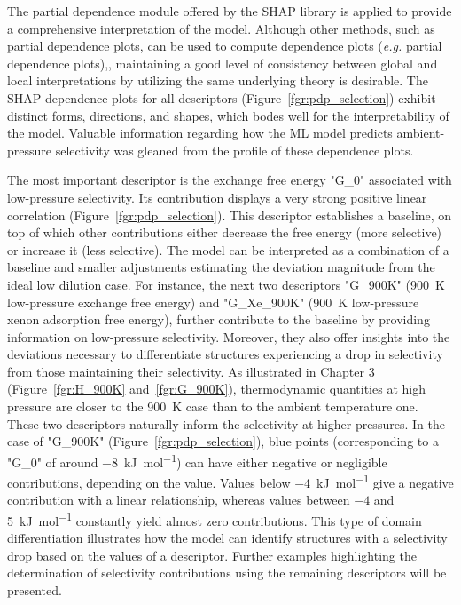 \documentclass[main]{subfiles}
\begin{document}
The partial dependence module offered by the SHAP library is applied to provide a comprehensive interpretation of the model. Although other methods, such as partial dependence plots, can be used to compute dependence plots (\emph{e.g.} partial dependence plots),\autocite{molnar2020interpretable}, maintaining a good level of consistency between global and local interpretations by utilizing the same underlying theory is desirable. The SHAP dependence plots for all descriptors (Figure~\ref{fgr:pdp_selection}) exhibit distinct forms, directions, and shapes, which bodes well for the interpretability of the model. Valuable information regarding how the ML model predicts ambient-pressure selectivity was gleaned from the profile of these dependence plots.

The most important descriptor is the exchange free energy "G\_0" associated with low-pressure selectivity. Its contribution displays a very strong positive linear correlation (Figure~\ref{fgr:pdp_selection}). This descriptor establishes a baseline, on top of which other contributions either decrease the free energy (more selective) or increase it (less selective). The model can be interpreted as a combination of a baseline and smaller adjustments estimating the deviation magnitude from the ideal low dilution case. For instance, the next two descriptors "G\_900K" (\SI{900}{\kelvin} low-pressure exchange free energy) and "G\_Xe\_900K" (\SI{900}{\kelvin} low-pressure xenon adsorption free energy), further contribute to the baseline by providing information on low-pressure selectivity. Moreover, they also offer insights into the deviations necessary to differentiate structures experiencing a drop in selectivity from those maintaining their selectivity. As illustrated in Chapter 3 (Figure~\ref{fgr:H_900K} and~\ref{fgr:G_900K}), thermodynamic quantities at high pressure are closer to the \SI{900}{\kelvin} case than to the ambient temperature one. These two descriptors naturally inform the selectivity at higher pressures. In the case of "G\_900K" (Figure~\ref{fgr:pdp_selection}), blue points (corresponding to a "G\_0" of around \SI{-8}{\kilo\joule\per\mole}) can have either negative or negligible contributions, depending on the value. Values below \SI{-4}{\kilo\joule\per\mole} give a negative contribution with a linear relationship, whereas values between $-4$ and \SI{5}{\kilo\joule\per\mole} constantly yield almost zero contributions. This type of domain differentiation illustrates how the model can identify structures with a selectivity drop based on the values of a descriptor. Further examples highlighting the determination of selectivity contributions using the remaining descriptors will be presented.
\end{document}
